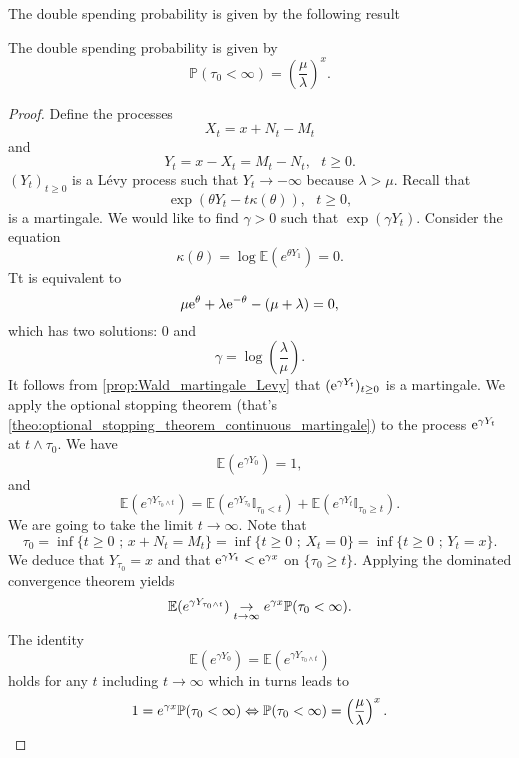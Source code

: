 The double spending probability is given by the following result
\begin{theo}\label{theo:ds_probability_Poisson_process}
The double spending probability is given by 
$$
\mathbb{P}(\tau_0 < \infty) = \left(\frac{\mu}{\lambda}\right)^x.
$$
\end{theo}
\begin{proof}

Define the processes
$$
X_t = x + N_t - M_t
$$ 
and
$$
Y_t = x - X_t = M_t - N_t,\text{ }t\geq0.
$$
$(Y_t)_{t\geq0}$ is a L\'evy process such that $Y_t\rightarrow - \infty$ because $\lambda >\mu$. Recall that 
$$
\exp(\theta Y_t - t\kappa(\theta)), \text{ }t\geq 0,
$$
is a martingale. We would like to find $\gamma>0$ such that $\exp(\gamma Y_t)$. Consider the equation 
$$
\kappa(\theta) =\log\mathbb{E}\left(e^{\theta Y_1}\right) = 0.
$$
Tt is equivalent to 
$$
\mu \mathrm{e}^\theta + \lambda \mathrm{e}^{-\theta}- (\mu+\lambda) =0,
$$
which has two solutions: $0$ and 
$$
\gamma = \log\left(\frac{\lambda}{\mu}\right).
$$
It follows from \cref{prop:Wald_martingale_Levy} that $(\mathrm{e}^{\gamma Y_t})_{t\geq 0}$ is a martingale. We apply the optional stopping theorem (that's \cref{theo:optional_stopping_theorem_continuous_martingale}) to the process $\mathrm{e}^{\gamma Y_t}$ at $t\land\tau_0$. We have 
\[
\mathbb{E}(e^{\gamma Y_0}) = 1,
\]
and 
\[
\mathbb{E}(e^{\gamma Y_{\tau_0\land t}}) = \mathbb{E}(e^{\gamma Y_{\tau_0}}\mathbb{I}_{\tau_0 < t }) + \mathbb{E}(e^{\gamma Y_{t}}\mathbb{I}_{\tau_0 \geq  t }).
\]
We are going to take the limit $t\rightarrow \infty$. Note that 
\[
\tau_0  = \inf\{t\geq 0\text{ ; }x+N_t = M_t\} = \inf\{t\geq 0\text{ ; }X_t = 0\} = \inf\{t\geq 0\text{ ; }Y_t = x\}.
\]
We deduce that $Y_{\tau_0} = x$ and that $\mathrm{e}^{\gamma Y_{t}} < \mathrm{e}^{\gamma x}$ on $\{\tau_0 \geq t\}$. Applying the dominated convergence theorem yields
\[
\mathbb{E}(e^{\gamma Y_{\tau_0\land t}}) \underset{t\rightarrow \infty}{\rightarrow} e^{\gamma x}\mathbb{P}(\tau_0 < \infty).
\]
The identity 
\[
\mathbb{E}(e^{\gamma Y_0}) =\mathbb{E}(e^{\gamma Y_{\tau_0\land t}})
\]
holds for any $t$ including $t\rightarrow \infty$ which in turns leads to 
\[
1 = e^{\gamma x}\mathbb{P}(\tau_0 < \infty)\Leftrightarrow \mathbb{P}(\tau_0<\infty) = \left(\frac{\mu}{\lambda}\right)^x.
\]
\end{proof}

